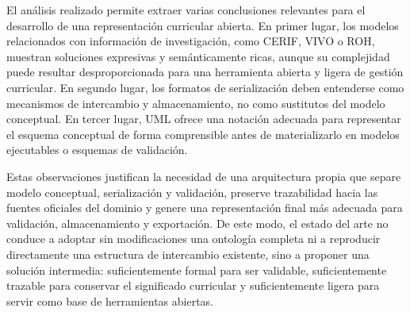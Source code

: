 El análisis realizado permite extraer varias conclusiones relevantes para el
desarrollo de una representación curricular abierta. En primer lugar, los modelos
relacionados con información de investigación, como CERIF, VIVO o ROH, muestran
soluciones expresivas y semánticamente ricas, aunque su complejidad puede resultar
desproporcionada para una herramienta abierta y ligera de gestión curricular. En
segundo lugar, los formatos de serialización deben entenderse como mecanismos de
intercambio y almacenamiento, no como sustitutos del modelo conceptual. En tercer
lugar, UML ofrece una notación adecuada para representar el esquema conceptual de
forma comprensible antes de materializarlo en modelos ejecutables o esquemas de
validación.

Estas observaciones justifican la necesidad de una arquitectura propia que separe
modelo conceptual, serialización y validación, preserve trazabilidad hacia las
fuentes oficiales del dominio y genere una representación final más adecuada para
validación, almacenamiento y exportación. De este modo, el estado del arte no
conduce a adoptar sin modificaciones una ontología completa ni a reproducir
directamente una estructura de intercambio existente, sino a proponer una solución
intermedia: suficientemente formal para ser validable, suficientemente trazable
para conservar el significado curricular y suficientemente ligera para servir como
base de herramientas abiertas.
